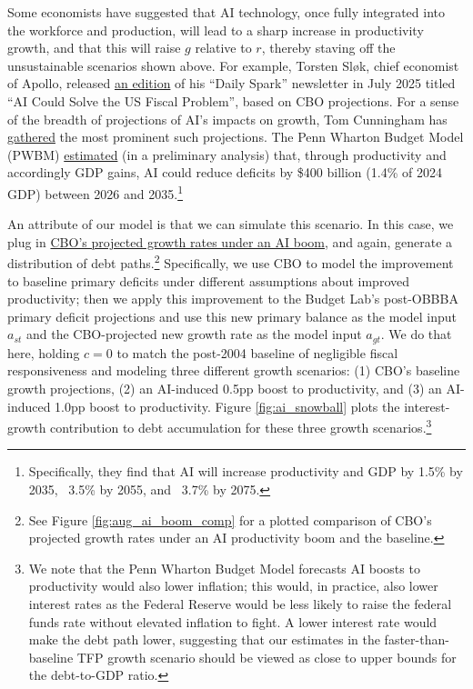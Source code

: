 \documentclass[12pt]{article}
\begin{document}
Some economists have suggested that AI technology, once fully integrated into the workforce and production, will lead to a sharp increase in productivity growth, and that this will raise $g$ relative to $r$, thereby staving off the unsustainable scenarios shown above. For example, Torsten Sløk, chief economist of Apollo, released \href{https://www.apolloacademy.com/ai-could-solve-the-us-fiscal-problem/}{an edition} of his ``Daily Spark'' newsletter in July 2025 titled ``AI Could Solve the US Fiscal Problem'', based on CBO projections. For a sense of the breadth of projections of AI's impacts on growth, Tom Cunningham has \href{https://tecunningham.github.io/posts/2025-10-19-forecasts-of-AI-growth.html}{gathered} the most prominent such projections. The Penn Wharton Budget Model (PWBM) \href{https://budgetmodel.wharton.upenn.edu/issues/2025/9/8/projected-impact-of-generative-ai-on-future-productivity-growth}{estimated} (in a preliminary analysis) that, through productivity and accordingly GDP gains, AI could reduce deficits by \$400 billion (1.4\% of 2024 GDP) between 2026 and 2035.\footnote{Specifically, they find that AI will increase productivity and GDP by 1.5\% by 2035, ~3.5\% by 2055, and ~3.7\% by 2075.}

An attribute of our model is that we can simulate this scenario. In this case, we plug in \href{https://www.cbo.gov/publication/61332}{CBO's projected growth rates under an AI boom}, and again, generate a distribution of debt paths.\footnote{See Figure \ref{fig:aug_ai_boom_comp} for a plotted comparison of CBO's projected growth rates under an AI productivity boom and the baseline.} Specifically, we use CBO to model the improvement to baseline primary deficits under different assumptions about improved productivity; then we apply this improvement to the Budget Lab's post-OBBBA primary deficit projections and use this new primary balance as the model input $a_{st}$ and the CBO-projected new growth rate as the model input $a_{gt}$. We do that here, holding $c=0$ to match the post-2004 baseline of negligible fiscal responsiveness and modeling three different growth scenarios: (1) CBO's baseline growth projections, (2) an AI-induced 0.5pp boost to productivity, and (3) an AI-induced 1.0pp boost to productivity. Figure \ref{fig:ai_snowball} plots the interest-growth contribution to debt accumulation for these three growth scenarios.\footnote{We note that the Penn Wharton Budget Model forecasts AI boosts to productivity would also lower inflation; this would, in practice, also lower interest rates as the Federal Reserve would be less likely to raise the federal funds rate without elevated inflation to fight. A lower interest rate would make the debt path lower, suggesting that our estimates in the faster-than-baseline TFP growth scenario should be viewed as close to upper bounds for the debt-to-GDP ratio.}
\end{document}
